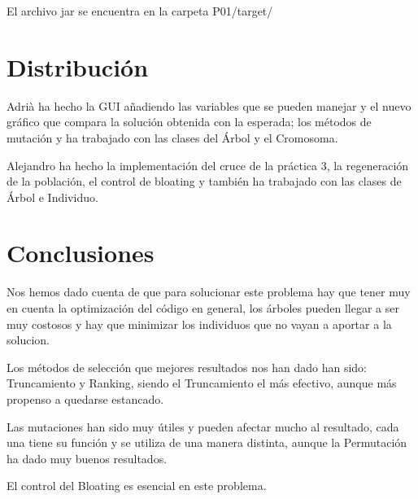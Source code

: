 \documentclass[twoside]{AiTeX}
\begin{document}
El archivo jar se encuentra en la carpeta P01/target/



\section{Distribución}

Adrià ha hecho la GUI añadiendo las variables que se pueden manejar y el nuevo gráfico que compara la solución obtenida con la esperada; los métodos de mutación y ha trabajado con las clases del Árbol y el Cromosoma.

Alejandro ha hecho la implementación del cruce de la práctica 3, la regeneración de la población, el control de bloating y también ha trabajado con las clases de Árbol e Individuo.

\section{Conclusiones}

Nos hemos dado cuenta de que para solucionar este problema hay que tener muy en cuenta la optimización del código en general, los árboles pueden llegar a ser muy costosos y hay que minimizar los individuos que no vayan a aportar a la solucion.

Los métodos de selección que mejores resultados nos han dado han sido: Truncamiento y Ranking, siendo el Truncamiento el más efectivo, aunque más propenso a quedarse estancado.

Las mutaciones han sido muy útiles y pueden afectar mucho al resultado, cada una tiene su función y se utiliza de una manera distinta, aunque la Permutación ha dado muy buenos resultados.

El control del Bloating es esencial en este problema.
\end{document}
